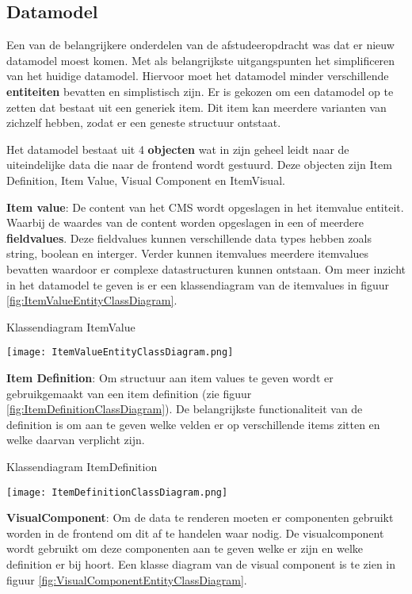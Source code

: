 \subsection{Datamodel}
Een van de belangrijkere onderdelen van de afstudeeropdracht was dat er nieuw datamodel moest komen.
Met als belangrijkste uitgangspunten het simplificeren van het huidige datamodel.
Hiervoor moet het datamodel minder verschillende \textbf{entiteiten} bevatten en simplistisch zijn.
Er is gekozen om een datamodel op te zetten dat bestaat uit een generiek item.
Dit item kan meerdere varianten van zichzelf hebben, zodat er een geneste structuur ontstaat.

\whitespace
Het datamodel bestaat uit 4 \textbf{objecten} wat in zijn geheel leidt naar de uiteindelijke data die naar de frontend wordt gestuurd.
Deze objecten zijn Item Definition, Item Value, Visual Component en ItemVisual.

\whitespace[2]
\textbf{Item value}: De content van het CMS wordt opgeslagen in het itemvalue entiteit.
Waarbij de waardes van de content worden opgeslagen in een of meerdere \textbf{fieldvalues}.
Deze fieldvalues kunnen verschillende data types hebben zoals string, boolean en interger.
Verder kunnen itemvalues meerdere itemvalues bevatten waardoor er complexe datastructuren kunnen ontstaan.
Om meer inzicht in het datamodel te geven is er een klassendiagram van de itemvalues in figuur \ref{fig:ItemValueEntityClassDiagram}.

\whitespace[2]
\begin{graphic}
    \captionsetup{type=figure}
    \caption{Klassendiagram ItemValue}
    \texttt{[image: ItemValueEntityClassDiagram.png]}
    \label{fig:ItemValueEntityClassDiagram}
\end{graphic}

\whitespace[2]
\textbf{Item Definition}: Om structuur aan item values te geven wordt er gebruikgemaakt van een item definition (zie figuur \ref{fig:ItemDefinitionClassDiagram}).
De belangrijkste functionaliteit van de definition is om aan te geven welke velden er op verschillende items zitten en welke daarvan verplicht zijn.

\whitespace[2]
\begin{graphic}
    \captionsetup{type=figure}
    \caption{Klassendiagram  ItemDefinition}
    \texttt{[image: ItemDefinitionClassDiagram.png]}
    \label{fig:ItemDefinitionClassDiagram}
\end{graphic}

\whitespace
\textbf{VisualComponent}: Om de data te renderen moeten er componenten gebruikt worden in de frontend om dit af te handelen waar nodig.
De visualcomponent wordt gebruikt om deze componenten aan te geven welke er zijn en welke definition er bij hoort.
Een klasse diagram van de visual component is te zien in figuur \ref{fig:VisualComponentEntityClassDiagram}.

